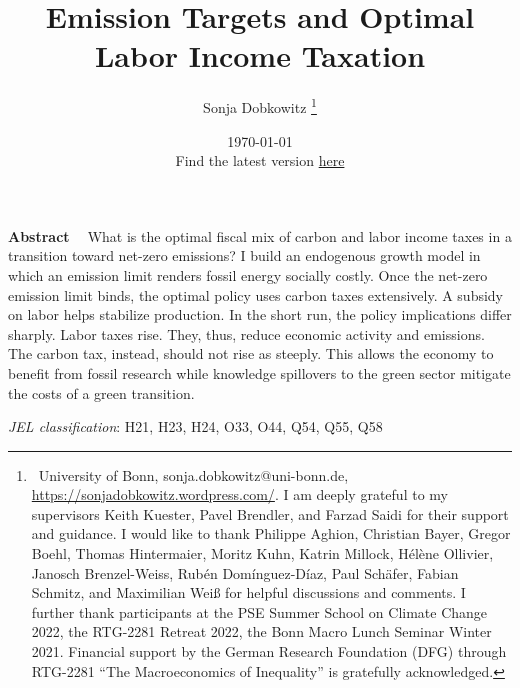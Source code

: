 \documentclass[12pt]{article}
\title{Emission Targets and Optimal Labor Income Taxation}
\author{Sonja Dobkowitz
\thanks{\ {University of Bonn, sonja.dobkowitz@uni-bonn.de, \url{https://sonjadobkowitz.wordpress.com/}.} \newline
	I am deeply grateful to my supervisors Keith Kuester, Pavel Brendler, and Farzad Saidi for their support and guidance. 
	I would like to thank Philippe Aghion, Christian Bayer, Gregor Boehl, Thomas Hintermaier,  Moritz Kuhn, Katrin Millock, Hélène Ollivier,  Janosch Brenzel-Weiss, Rubén Domínguez-Díaz, Paul Schäfer, Fabian Schmitz, and Maximilian Weiß for helpful discussions and comments.  
	I further thank participants at the PSE Summer School on Climate Change 2022, the RTG-2281 Retreat 2022, the Bonn Macro Lunch Seminar Winter 2021.
	Financial support by the German Research Foundation (DFG) through RTG-2281 “The Macroeconomics of Inequality” is gratefully acknowledged.}}
\date{\today \\ \vspace{1mm} \small{Find the latest version  \href{https://sonjadobkowitz.wordpress.com/job-market-paper/}{here}}
}
\renewenvironment{abstract}
{\small
	\list{}{
		\setlength{\leftmargin}{0.025\textwidth}%
		\setlength{\rightmargin}{\leftmargin}%
	}%
	\item\relax}
{\endlist}
\begin{document}
%	
	\maketitle
	\begin{abstract}
		\begin{onehalfspacing}
			\textbf{Abstract \ }
What is the optimal fiscal mix of  carbon and labor income taxes in a transition toward net-zero emissions? I build an endogenous growth model in which an emission limit renders fossil energy socially costly. Once the net-zero emission limit binds, the optimal policy uses carbon taxes extensively. A subsidy on labor helps stabilize production. In the short run, the policy implications differ sharply. Labor taxes rise. They, thus, reduce economic activity and emissions. The carbon tax, instead, should not rise as steeply. This allows the economy to benefit from fossil research while knowledge spillovers to the green sector mitigate the costs of a green transition.

	\noindent \textit{JEL classification}: H21, H23, H24, O33, O44, Q54, Q55, Q58
			
		\end{onehalfspacing}
		\end{abstract}






%

%
%


\end{document}

